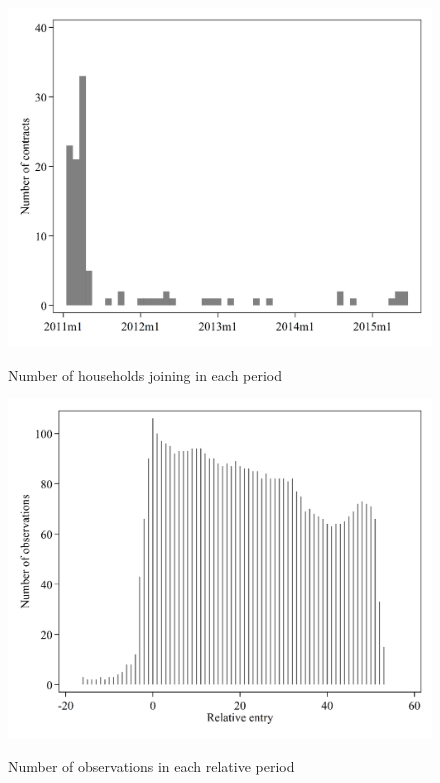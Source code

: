\begin{figure}[ht]
  \caption{Number of households joining in each period}\label{fig:nine}
  \begin{center}
  {\includegraphics[width=1\textwidth]{./figures/image9.png}}
  \end{center}
\end{figure}

\FloatBarrier

\begin{figure}[ht]
  \caption{Number of observations in each relative period}\label{fig:ten}
  \begin{center}
  {\includegraphics[width=1\textwidth]{./figures/image10.png}}
  \end{center}
\end{figure}

